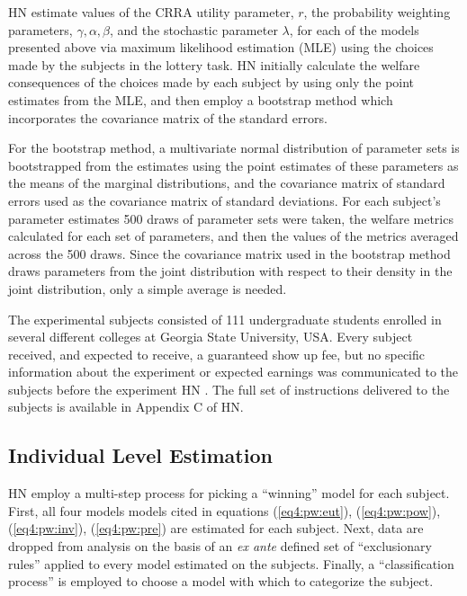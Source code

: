 \documentclass[../main.tex]{subfiles}
\begin{document}
HN estimate values of the CRRA utility parameter, $r$, the probability weighting parameters, $\gamma, \alpha, \beta$, and the stochastic parameter $\lambda$, for each of the models presented above via maximum likelihood estimation (MLE) using the choices made by the subjects in the lottery task.
HN \parencite*[107,110]{Harrison2016} initially calculate the welfare consequences of the choices made by each subject by using only the point estimates from the MLE, and then employ a bootstrap method which incorporates the covariance matrix of the standard errors.

For the bootstrap method, a multivariate normal distribution of parameter sets is bootstrapped from the estimates using the point estimates of these parameters as the means of the marginal distributions, and the covariance matrix of standard errors used as the covariance matrix of standard deviations.
For each subject's parameter estimates 500 draws of parameter sets were taken, the welfare metrics calculated for each set of parameters, and then the values of the metrics averaged across the 500 draws.
Since the covariance matrix used in the bootstrap method draws parameters from the joint distribution with respect to their density in the joint distribution, only a simple average is needed.

The experimental subjects consisted of 111 undergraduate students enrolled in several different colleges at Georgia State University, USA.
Every subject received, and expected to receive, a guaranteed  show up fee, but no specific information about the experiment or expected earnings was communicated to the subjects before the experiment HN \parencite*[98]{Harrison2016}.
The full set of instructions delivered to the subjects is available in Appendix C of HN.

\singlespacing
\subsection{Individual Level Estimation}
\doublespacing
\label{sec4:ILE}

HN employ a multi-step process for picking a \enquote{winning} model for each subject.
First, all four models models cited in equations (\ref{eq4:pw:eut}), (\ref{eq4:pw:pow}), (\ref{eq4:pw:inv}), (\ref{eq4:pw:pre}) are estimated for each subject.
Next, data are dropped from analysis on the basis of an \textit{ex ante} defined set of \enquote{exclusionary rules} applied to every model estimated on the subjects.
Finally, a \enquote{classification process} is employed to choose a model with which to categorize the subject.
\end{document}
